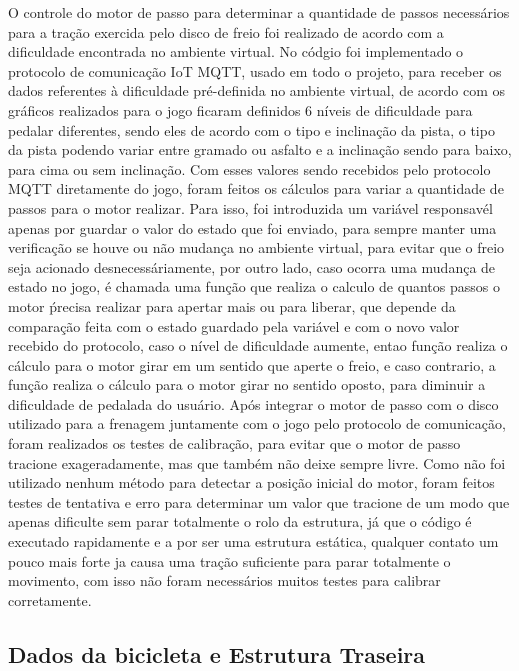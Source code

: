 		O controle do motor de passo para determinar a quantidade de passos necessários para a tração exercida pelo disco de freio foi realizado  de acordo com a dificuldade encontrada no ambiente virtual. No códgio foi implementado o protocolo de comunicação IoT MQTT, usado em todo o projeto, para receber os dados referentes à dificuldade pré-definida no ambiente virtual, de acordo com os gráficos realizados para o jogo ficaram definidos 6 níveis de dificuldade para pedalar diferentes, sendo eles de acordo com o tipo e inclinação da pista, o tipo da pista podendo variar entre gramado ou asfalto e a inclinação sendo para baixo, para cima ou sem inclinação. Com esses  valores sendo recebidos pelo protocolo MQTT diretamente do jogo, foram feitos os cálculos para variar a quantidade de passos para o motor realizar. Para isso, foi introduzida um variável responsavél apenas por guardar o valor do estado que foi enviado, para sempre manter uma verificação se houve ou não mudança no ambiente virtual, para evitar que o freio seja acionado desnecessáriamente, por outro lado, caso ocorra uma mudança de estado no jogo, é chamada uma função que realiza o calculo de quantos passos o motor ṕrecisa realizar para apertar mais ou para liberar, que depende da comparação feita com o estado guardado pela variável e com o novo valor recebido do protocolo, caso o nível de dificuldade aumente, entao função realiza o cálculo para o motor girar em um sentido que aperte o freio, e caso contrario, a função realiza o cálculo para o motor girar no sentido oposto, para diminuir a dificuldade de pedalada do usuário.
		Após integrar o motor de passo com o disco utilizado para a frenagem juntamente com o jogo pelo protocolo de comunicação, foram realizados os testes de calibração, para evitar que o motor de passo tracione exageradamente, mas que também não deixe sempre livre. Como não foi utilizado nenhum método para detectar a posição inicial do motor, foram feitos testes de tentativa e erro para determinar um valor que tracione de um modo que apenas dificulte sem parar totalmente o rolo da estrutura, já que o código é executado rapidamente e a por ser uma estrutura estática, qualquer contato um pouco mais forte ja causa uma tração suficiente para parar totalmente o movimento, com isso não foram necessários muitos testes para calibrar corretamente.
	 
\subsection{Dados da bicicleta e Estrutura Traseira}

